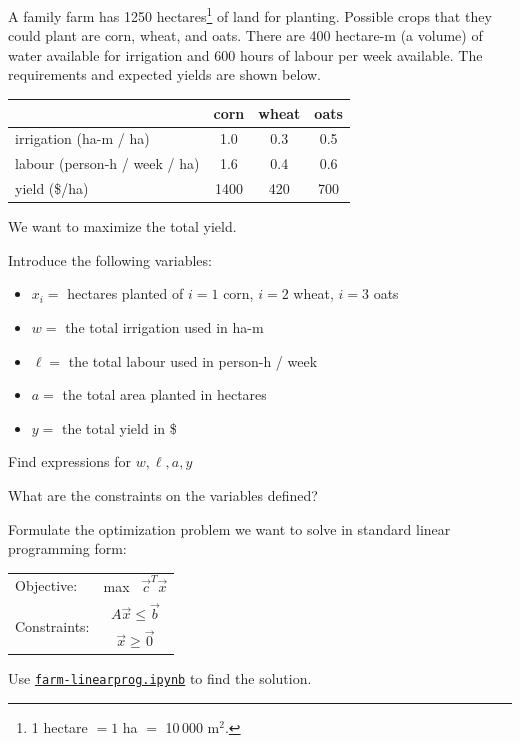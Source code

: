 \begin{slide}
\question

\begin{problem}
	A family farm has 1250 hectares\footnote{1 hectare $=1$ ha $=$ 10\,000 m$^2$.}  of land for planting. Possible crops that they could plant are corn, wheat, and oats. There are 400 hectare-m (a volume) of water available for irrigation and 600 hours of labour per week available. The requirements and expected yields are shown below.
	
	
	\begin{center}
	\small
	\begin{tabular}{l|c|c|c}
	& corn & wheat & oats \\ \hline
	irrigation (ha-m / ha) & 1.0 & 0.3 & 0.5 \\ \hline
	labour (person-h / week / ha) & 1.6 & 0.4 & 0.6 \\ \hline
	yield (\$/ha) & 1400 & 420 & 700 \\ %
	\end{tabular}
	\end{center}
	
	We want to maximize the total yield.
\end{problem}

Introduce the following variables:
\begin{itemize}
	\item $x_i= $ hectares planted of $i=1$ corn, $i=2$ wheat, $i=3$ oats
	\item $w=$ the total irrigation used in ha-m
	\item $\ell=$ the total labour used in person-h / week
	\item $a=$ the total area planted in hectares
	\item $y=$ the total yield in \$
\end{itemize}

\begin{parts}
	\item Find expressions for $w, \ell, a, y$
	\item What are the constraints on the variables defined?	
	\item Formulate the optimization problem we want to solve in standard linear programming form:
	\begin{center}
		\begin{tabular}{lc}
		Objective: 		& max \ $\vec{c}^T \vec{x}$ \\
		\multirow{2}{*}{Constraints:} 	& $A \vec{x} \leq \vec{b}$ \\
						& $\vec{x} \geq \vec{0}$
		\end{tabular}
	\end{center}
	\item Use \href{https://utoronto.syzygy.ca/jupyter/user-redirect/git-pull?repo=https://github.com/bigfatbernie/IBLMathModeling&subPath=book/python/farm-linearprog.ipynb}{\tt farm-linearprog.ipynb} to find the solution.

\end{parts}

\end{slide}


